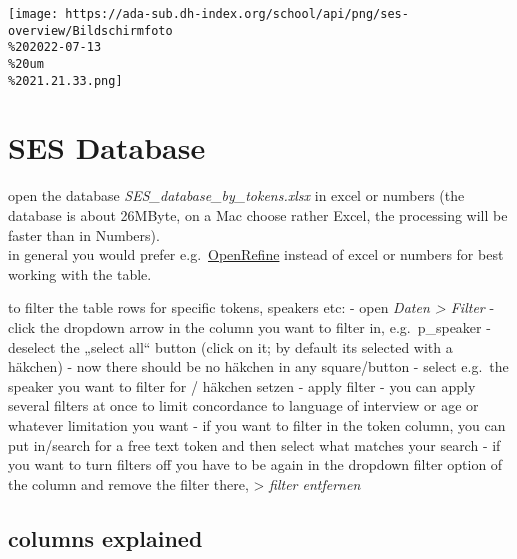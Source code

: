 \documentclass[
  12pt,
]{article}
\begin{document}
\texttt{[image: https://ada-sub.dh-index.org/school/api/png/ses-overview/Bildschirmfoto\\\%202022-07-13\\\%20um\\\%2021.21.33.png]}

\hypertarget{ses-database}{%
\section{SES Database}\label{ses-database}}

open the database \emph{SES\_database\_by\_tokens.xlsx} in excel or
numbers (the database is about 26MByte, on a Mac choose rather Excel,
the processing will be faster than in Numbers).\\
in general you would prefer
e.g.~\href{https://openrefine.org/docs/manual/installing}{OpenRefine}
instead of excel or numbers for best working with the table.

to filter the table rows for specific tokens, speakers etc: - open
\emph{Daten \textgreater{} Filter} - click the dropdown arrow in the
column you want to filter in, e.g.~p\_speaker - deselect the „select
all`` button (click on it; by default its selected with a häkchen) - now
there should be no häkchen in any square/button - select e.g.~the
speaker you want to filter for / häkchen setzen - apply filter - you can
apply several filters at once to limit concordance to language of
interview or age or whatever limitation you want - if you want to filter
in the token column, you can put in/search for a free text token and
then select what matches your search - if you want to turn filters off
you have to be again in the dropdown filter option of the column and
remove the filter there, \textgreater{} \emph{filter entfernen}

\hypertarget{columns-explained}{%
\subsection{columns explained}\label{columns-explained}}
\end{document}
